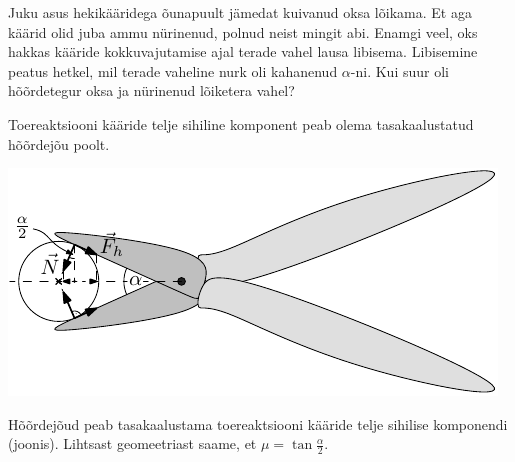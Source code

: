
Juku asus hekikääridega õunapuult jämedat kuivanud oksa lõikama. Et aga käärid olid juba ammu nürinenud, polnud neist mingit abi. Enamgi veel, oks hakkas kääride kokkuvajutamise ajal terade vahel lausa libisema. Libisemine peatus hetkel, mil terade vaheline nurk oli kahanenud $\alpha$-ni. Kui suur oli hõõrdetegur oksa ja nürinenud lõiketera vahel?

\hint
Toereaktsiooni kääride telje sihiline komponent peab olema tasakaalustatud hõõrdejõu poolt.

\solu
\begin{center}
	\includegraphics[width=0.9\linewidth]{2009-v3g-01-G_nyrinenud_kaarid_lah.pdf}
\end{center}

Hõõrdejõud peab tasakaalustama toereaktsiooni kääride telje sihilise komponendi (joonis). Lihtsast geomeetriast saame, et $\mu = \tan \frac{\alpha}{2}$.\probend